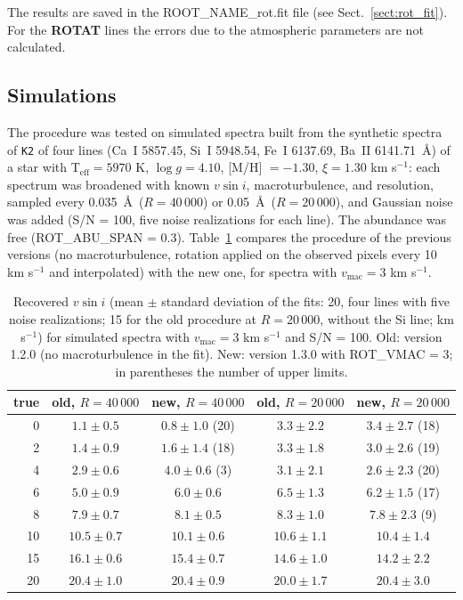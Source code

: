 \documentclass[modern]{aastex701}
\begin{document}
The results are saved in the ROOT\_NAME\_rot.fit file (see Sect.~\ref{sect:rot_fit}). For the {\bf ROTAT} lines the errors due to the atmospheric parameters are not calculated.

\subsection{Simulations}
The procedure was tested on simulated spectra built from the synthetic spectra of \texttt{K2} of four lines (Ca~I 5857.45, Si~I 5948.54, Fe~I 6137.69, Ba~II 6141.71~\AA) of a star with T$_{\mathrm{eff}} = 5970$ K, $\log g = 4.10$, [M/H] $= -1.30$, $\xi = 1.30$ km s$^{-1}$: each spectrum was broadened with known $v \sin i$, macroturbulence, and resolution, sampled every 0.035~\AA\ ($R = 40\,000$) or 0.05~\AA\ ($R = 20\,000$), and Gaussian noise was added (S/N = 100, five noise realizations for each line). The abundance was free (ROT\_ABU\_SPAN = 0.3). Table~\ref{tab:rot_sims} compares the procedure of the previous versions (no macroturbulence, rotation applied on the observed pixels every 10 km s$^{-1}$ and interpolated) with the new one, for spectra with $v_{\mathrm{mac}} = 3$ km s$^{-1}$.

\begin{table}[h]
    \centering
    \caption{Recovered $v \sin i$ (mean $\pm$ standard deviation of the fits: 20, four lines with five noise realizations; 15 for the old procedure at $R = 20\,000$, without the Si line; km s$^{-1}$) for simulated spectra with $v_{\mathrm{mac}} = 3$ km s$^{-1}$ and S/N = 100. Old: version 1.2.0 (no macroturbulence in the fit). New: version 1.3.0 with ROT\_VMAC = 3; in parentheses the number of upper limits.}
    \label{tab:rot_sims}
    \small
    \begin{tabular}{rcccc}
        \hline
        true & old, $R=40\,000$ & new, $R=40\,000$ & old, $R=20\,000$ & new, $R=20\,000$ \\
        \hline
         0 & $1.1 \pm 0.5$ & $0.8 \pm 1.0$ (20) & $3.3 \pm 2.2$ & $3.4 \pm 2.7$ (18) \\
         2 & $1.4 \pm 0.9$ & $1.6 \pm 1.4$ (18) & $3.3 \pm 1.8$ & $3.0 \pm 2.6$ (19) \\
         4 & $2.9 \pm 0.6$ & $4.0 \pm 0.6$ (3)  & $3.1 \pm 2.1$ & $2.6 \pm 2.3$ (20) \\
         6 & $5.0 \pm 0.9$ & $6.0 \pm 0.6$      & $6.5 \pm 1.3$ & $6.2 \pm 1.5$ (17) \\
         8 & $7.9 \pm 0.7$ & $8.1 \pm 0.5$      & $8.3 \pm 1.0$ & $7.8 \pm 2.3$ (9) \\
        10 & $10.5 \pm 0.7$ & $10.1 \pm 0.6$    & $10.6 \pm 1.1$ & $10.4 \pm 1.4$ \\
        15 & $16.1 \pm 0.6$ & $15.4 \pm 0.7$    & $14.6 \pm 1.0$ & $14.2 \pm 2.2$ \\
        20 & $20.4 \pm 1.0$ & $20.4 \pm 0.9$    & $20.0 \pm 1.7$ & $20.4 \pm 3.0$ \\
        \hline
    \end{tabular}
\end{table}
\end{document}
